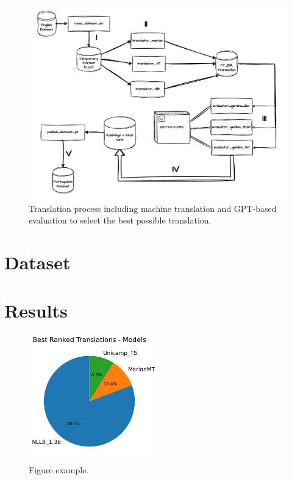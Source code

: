 \documentclass{article}
\begin{document}
\begin{figure}[htbp]
    \centering
    \includegraphics[width=1\textwidth]{drawio/translation.drawio.pdf}
    \caption{\label{fig:diagram}Translation process including machine
    translation and GPT-based evaluation to select the best possible
    translation.}
\end{figure}


\section{Dataset}

\section{Results}

\begin{figure}[htbp]
    \centering
    \includegraphics[width=0.5\textwidth]{figures/pie-chart.png}
    \caption{\label{fig:pie}Figure example.}
\end{figure}
\end{document}
